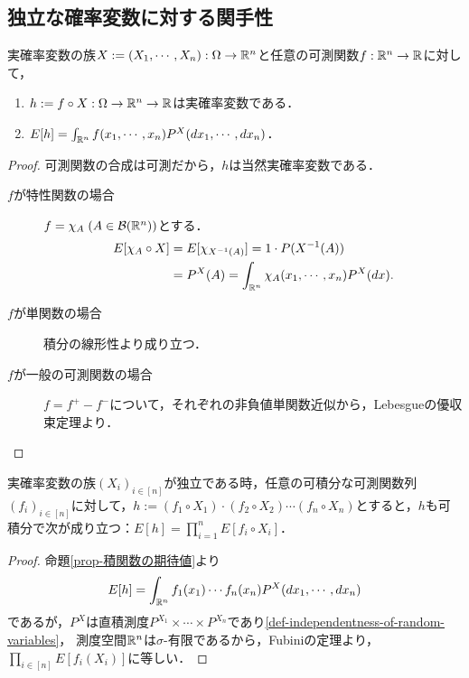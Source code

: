 \documentclass[uplatex,dvipdfmx]{jsreport}
\begin{document}
\subsection{独立な確率変数に対する関手性}

\begin{proposition}[実空間の議論への持ち上げ]\label{prop-積関数の期待値}
    実確率変数の族$X:=(X_1,\cdots,X_n):\Omega\to\mathbb{R}^n$と任意の可測関数$f:\mathbb{R}^n\to\mathbb{R}$に対して，
    \begin{enumerate}
        \item $h:=f\circ X:\Omega\to\mathbb{R}^n\to\mathbb{R}$は実確率変数である．
        \item $E[h]=\int_{\mathbb{R}^n}f(x_1,\cdots,x_n)P^X(dx_1,\cdots,dx_n)$．
    \end{enumerate}
\end{proposition}
\begin{proof}
    可測関数の合成は可測だから，$h$は当然実確率変数である．
    \begin{description}
        \item[$f$が特性関数の場合] $f=\chi_A\;(A\in\mathcal{B}(\mathbb{R}^n))$とする．
        \begin{align*}
            E[\chi_A\circ X]&=E[\chi_{X^{-1}(A)}]=1\cdot P(X^{-1}(A))\\
            &=P^X(A)=\int_{\mathbb{R}^n}\chi_A(x_1,\cdots,x_n)P^X(dx).
        \end{align*}
        \item[$f$が単関数の場合]
        積分の線形性より成り立つ．
        \item[$f$が一般の可測関数の場合]
        $f=f^+-f^-$について，それぞれの非負値単関数近似から，Lebesgueの優収束定理より．
    \end{description}
\end{proof}

\begin{corollary}[期待値が積を保つ条件]\label{cor-mean-of-product-of-independent-variables}
    実確率変数の族$(X_i)_{i\in[n]}$が独立である時，任意の可積分な可測関数列$(f_i)_{i\in[n]}$に対して，$h:=(f_1\circ X_1)\cdot(f_2\circ X_2)\cdots(f_n\circ X_n)$とすると，$h$も可積分で次が成り立つ：$E[h]=\prod_{i=1}^nE[f_i\circ X_i]$．
\end{corollary}
\begin{proof}
    命題\ref{prop-積関数の期待値}より
    \[E[h]=\int_{\mathbb{R}^n}f_1(x_1)\cdots f_n(x_n)P^X(dx_1,\cdots,dx_n)\]
    であるが，$P^X$は直積測度$P^{X_1}\times\cdots\times P^{X_n}$であり\ref{def-independentness-of-random-variables}，
    測度空間$\mathbb{R}^n$は$\sigma$-有限であるから，Fubiniの定理より，$\prod_{i\in[n]}E[f_i(X_i)]$に等しい．
\end{proof}
\end{document}
